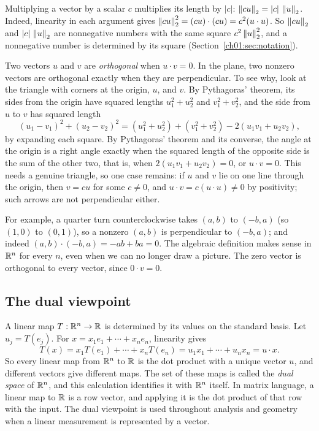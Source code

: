 Multiplying a vector by a scalar $c$ multiplies its length by $|c|$: $\left\|cu\right\|_2=|c|\,\left\|u\right\|_2$. Indeed, linearity in each argument gives $\left\|cu\right\|_2^2=(cu)\cdot(cu)=c^2(u\cdot u)$. So $\left\|cu\right\|_2$ and $|c|\,\left\|u\right\|_2$ are nonnegative numbers with the same square $c^2\left\|u\right\|_2^2$, and a nonnegative number is determined by its square (Section~\ref{ch01:sec:notation}).

Two vectors $u$ and $v$ are \emph{orthogonal} when $u\cdot v=0$. In the plane, two nonzero vectors are orthogonal exactly when they are perpendicular. To see why, look at the triangle with corners at the origin, $u$, and $v$. By Pythagoras' theorem, its sides from the origin have squared lengths $u_1^2+u_2^2$ and $v_1^2+v_2^2$, and the side from $u$ to $v$ has squared length
\[
(u_1-v_1)^2+(u_2-v_2)^2=(u_1^2+u_2^2)+(v_1^2+v_2^2)-2(u_1v_1+u_2v_2),
\]
by expanding each square. By Pythagoras' theorem and its converse, the angle at the origin is a right angle exactly when the squared length of the opposite side is the sum of the other two, that is, when $2(u_1v_1+u_2v_2)=0$, or $u\cdot v=0$. This needs a genuine triangle, so one case remains: if $u$ and $v$ lie on one line through the origin, then $v=cu$ for some $c\ne0$, and $u\cdot v=c(u\cdot u)\ne0$ by positivity; such arrows are not perpendicular either.

For example, a quarter turn counterclockwise takes $(a,b)$ to $(-b,a)$ (so $(1,0)$ to $(0,1)$), so a nonzero $(a,b)$ is perpendicular to $(-b,a)$; and indeed $(a,b)\cdot(-b,a)=-ab+ba=0$. The algebraic definition makes sense in $\mathbb R^n$ for every $n$, even when we can no longer draw a picture. The zero vector is orthogonal to every vector, since $0\cdot v=0$.

\subsection*{The dual viewpoint}
A linear map $T:\mathbb R^n\to\mathbb R$ is determined by its values on the standard basis. Let $u_j=T(e_j)$. For $x=x_1e_1+\cdots+x_ne_n$, linearity gives
\[
T(x)=x_1T(e_1)+\cdots+x_nT(e_n)=u_1x_1+\cdots+u_nx_n=u\cdot x.
\]
So every linear map from $\mathbb R^n$ to $\mathbb R$ is the dot product with a unique vector $u$, and different vectors give different maps. The set of these maps is called the \emph{dual space} of $\mathbb R^n$, and this calculation identifies it with $\mathbb R^n$ itself. In matrix language, a linear map to $\mathbb R$ is a row vector, and applying it is the dot product of that row with the input. The dual viewpoint is used throughout analysis and geometry when a linear measurement is represented by a vector.
